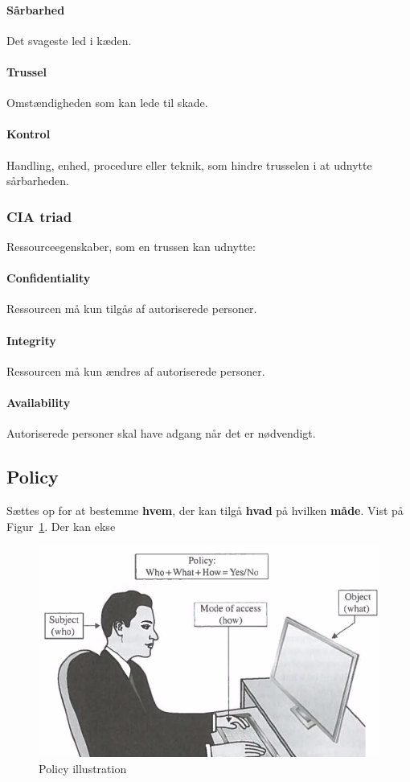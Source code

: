\paragraph{Sårbarhed}
Det svageste led i kæden.

\paragraph{Trussel}
Omstændigheden som kan lede til skade.

\paragraph{Kontrol}
Handling, enhed, procedure eller teknik, som hindre trusselen i at udnytte sårbarheden.

\subsubsection{CIA triad}
Ressourceegenskaber, som en trussen kan udnytte:

\paragraph{Confidentiality}
Ressourcen må kun tilgås af autoriserede personer.

\paragraph{Integrity}
Ressourcen må kun ændres af autoriserede personer. 

\paragraph{Availability}
Autoriserede personer skal have adgang når det er nødvendigt.

\subsection{Policy}
Sættes op for at bestemme \textbf{hvem}, der kan tilgå \textbf{hvad} på hvilken \textbf{måde}. Vist på Figur~\ref{fig:policy}. Der kan ekse

\begin{figure}[H]
	\centering
	\includegraphics[width=0.8\linewidth]{figs/spm1/policy}
	\caption{Policy illustration}
	\label{fig:policy}
\end{figure}

